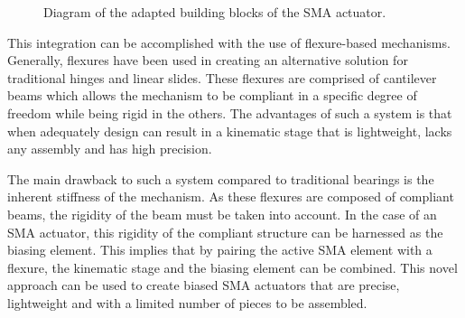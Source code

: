 \begin{figure}[h] %
  \centering
  \caption{Diagram of the adapted building blocks of the SMA actuator.}
  \label{fig:building-blocks-pt}
\end{figure}

This integration can be accomplished with the use of flexure-based mechanisms. Generally, flexures have been used in creating an alternative solution for traditional hinges and linear slides. These flexures are comprised of cantilever beams which allows the mechanism to be compliant in a specific degree of freedom while being rigid in the others. The advantages of such a system is that when adequately design can result in a kinematic stage that is lightweight, lacks any assembly and has high precision.


The main drawback to such a system compared to traditional bearings is the inherent stiffness of the mechanism. As these flexures are composed of compliant beams, the rigidity of the beam must be taken into account. In the case of an SMA actuator, this rigidity of the compliant structure can be harnessed as the biasing element. This implies that by pairing the active SMA element with a flexure, the kinematic stage and the biasing element can be combined. This novel approach can be used to create biased SMA actuators that are precise, lightweight and with a limited number of pieces to be assembled.

